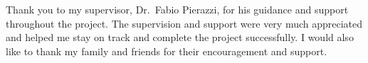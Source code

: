 Thank you to my supervisor, Dr.\ Fabio Pierazzi, for his guidance and support throughout the project. The supervision and support were very much appreciated and helped me stay on track and complete the project successfully. I would also like to thank my family and friends for their encouragement and support.